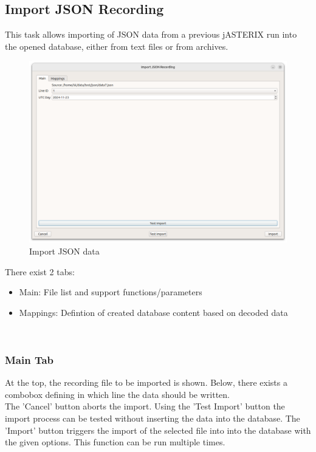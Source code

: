 \subsection{Import JSON Recording}
\label{sec:ui_import_json}

This task allows importing of JSON data from a previous jASTERIX run into the opened database, either from text files or from archives. \\

\begin{figure}[H]
  \hspace*{-0.5cm}
    \includegraphics[width=17cm]{figures/import_json_data.png}
  \caption{Import JSON data}
\end{figure}

There exist 2 tabs:

\begin{itemize}  
\item Main: File list and support functions/parameters
\item Mappings: Defintion of created database content based on decoded data
\end{itemize}
\ \\

\subsubsection{Main Tab}

At the top, the recording file to be imported is shown. Below, there exists a combobox defining in which line the data should be written. \\

The 'Cancel' button aborts the import. Using the 'Test Import' button the import process can be tested without inserting the data into the database. 
The 'Import' button triggers the import of the selected file into into the database with the given options. This function can be run multiple times. \\

